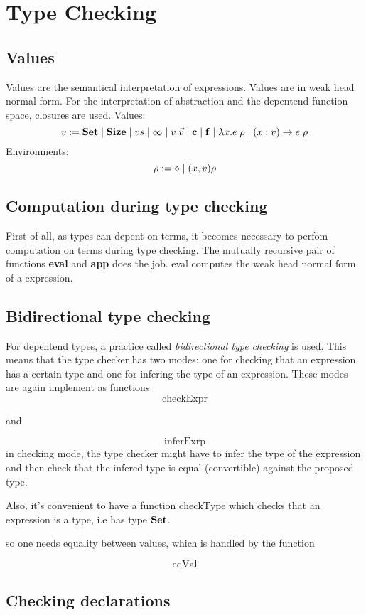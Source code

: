 \section{Type Checking}
\subsection{Values}
Values are the semantical interpretation of expressions.
Values are in weak head normal form.
For the interpretation of abstraction and the depentend function space, closures are used.
Values:
\[ v := \mathbf{Set} \;\vert\; \mathbf{Size} \;\vert\; vs \;\vert\; \infty \;\vert\; v \; \vec{v} \;\vert\; \mathbf{c} \;\vert\; \mathbf{f} \;\vert\; \lambda x . e \; \rho \;\vert\; ( x : v ) \rightarrow e \; \rho\]
Environments:
\[ \rho := \diamond \;\vert\; (x,v) \rho \]

\subsection{Computation during type checking}
First of all, as types can depent on terms, it becomes necessary to perfom computation on terms during type checking.
The mutually recursive pair of functions 
\textbf{eval} and \textbf{app} does the job.
eval computes the weak head normal form of a expression.
\subsection{Bidirectional type checking} 
For depentend types, a practice called \emph{bidirectional type checking} is used.
This means that the type checker has two modes:
one for checking that an expression has a certain type and one for infering the type of an expression.
These modes are again implement as functions
\[ \mathrm{checkExpr} \]

and

\[ \mathrm{inferExrp} \]
in checking mode, the type checker might have to infer the type of the expression and then check that the infered
type is equal (convertible) against the proposed type.

Also, it's convenient to have a function $ \mathrm{checkType} $
which checks that an expression is a type, i.e has type $\mathbf{Set}$.

so one needs equality between values, which is handled by the function

\[ \mathrm{eqVal} \]

\subsection{Checking declarations}
